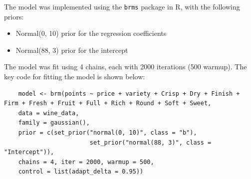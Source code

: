 \documentclass{article}
\begin{document}
The model was implemented using the \texttt{brms} package in R, with the following priors:
\begin{itemize}
\item Normal(0, 10) prior for the regression coefficients
\item Normal(88, 3) prior for the intercept
\end{itemize}

The model was fit using 4 chains, each with 2000 iterations (500 warmup). The key code for fitting the model is shown below:
\begin{lstlisting}
	model <- brm(points ~ price + variety + Crisp + Dry + Finish + Firm + Fresh + Fruit + Full + Rich + Round + Soft + Sweet,
	data = wine_data,
	family = gaussian(), 
	prior = c(set_prior("normal(0, 10)", class = "b"), 
						set_prior("normal(88, 3)", class = "Intercept")),
	chains = 4, iter = 2000, warmup = 500,
	control = list(adapt_delta = 0.95))
\end{lstlisting}
\end{document}
